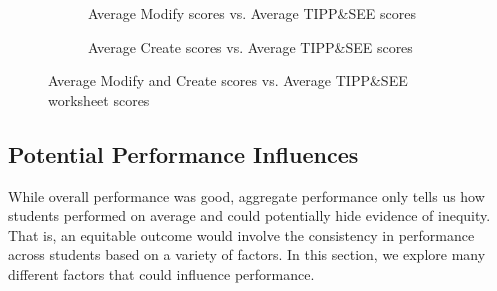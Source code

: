 \documentclass[sigconf,manuscript,review,anonymous]{acmart} %
\def\ts{TIPP\&SEE}
\begin{document}
\begin{figure}
     \centering
     \begin{subfigure}{0.49\textwidth}
        \caption{Average Modify scores vs. Average \ts{} scores}
        \label{fig:avg_modify}
    \end{subfigure}
    \begin{subfigure}{0.49\textwidth}
        \caption{Average Create scores vs. Average \ts{} scores}
        \label{fig:avg_create}
    \end{subfigure}
    
    \caption{Average Modify and Create scores vs. Average \ts{} worksheet scores}
\end{figure}


\subsection{Potential Performance Influences}
While overall performance was good, aggregate performance only tells us how students performed on average and could potentially hide evidence of inequity. That is, an equitable outcome would involve the consistency in performance across students based on a variety of factors. In this section, we explore many different factors that could influence performance.
\end{document}
